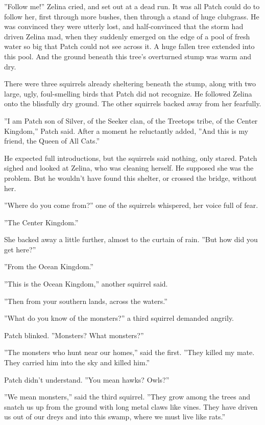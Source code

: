 \documentclass[12pt]{book}
\begin{document}
''Follow me!'' Zelina cried, and set out at a dead run. It was all
Patch could do to follow her, first through more bushes, then through
a stand of huge clubgrass. He was convinced they were utterly lost,
and half-convinced that the storm had driven Zelina mad, when they
suddenly emerged on the edge of a pool of fresh water so big that
Patch could not see across it. A huge fallen tree extended into this
pool. And the ground beneath this tree's overturned stump was warm and
dry.

There were three squirrels already sheltering beneath the stump, along
with two large, ugly, foul-smelling birds that Patch did not
recognize. He followed Zelina onto the blissfully dry ground. The
other squirrels backed away from her fearfully.

''I am Patch son of Silver, of the Seeker clan, of the Treetops tribe,
of the Center Kingdom,'' Patch said. After a moment he reluctantly
added, ''And this is my friend, the Queen of All Cats.''

He expected full introductions, but the squirrels said nothing, only
stared. Patch sighed and looked at Zelina, who was cleaning
herself. He supposed she was the problem. But he wouldn't have found
this shelter, or crossed the bridge, without her.

''Where do you come from?'' one of the squirrels whispered, her voice
full of fear.

''The Center Kingdom.''

She backed away a little further, almost to the curtain of rain. ''But
how did you get here?''

''From the Ocean Kingdom.''

''This is the Ocean Kingdom,'' another squirrel said.

''Then from your southern lands, across the waters.''

''What do you know of the monsters?'' a third squirrel demanded
angrily.

Patch blinked. ''Monsters? What monsters?''

''The monsters who hunt near our homes,'' said the first. ''They
killed my mate. They carried him into the sky and killed him.''

Patch didn't understand. ''You mean hawks? Owls?''

''We mean monsters,'' said the third squirrel. ''They grow among the
trees and snatch us up from the ground with long metal claws like
vines. They have driven us out of our dreys and into this swamp, where
we must live like rats.''
\end{document}
